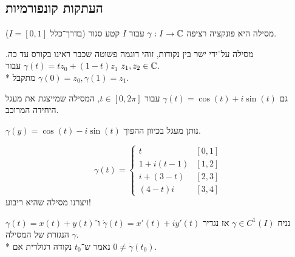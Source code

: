 \subsection{העתקות קונפורמיות}
\begin{definition}
	מסילה היא פונקציה רציפה $\gamma : I \to \mathbb{C}$ עבור $I$ קטע סגור (בדרך־כלל $I = [0, 1]$).
\end{definition}
\begin{example}
	מסילה על־ידי ישר בין נקודות, זוהי דוגמה פשוטה שכבר ראינו בקורס עד כה.
	$\gamma(t) = tz_0 + (1 - t)z_1$ עבור $z_1, z_2 \in \mathbb{C}$. \\*
	מתקבל $\gamma(0) = z_0, \gamma(1) = z_1$.
\end{example}
\begin{example}
	גם $\gamma(t) = \cos(t) + i \sin(t)$ עבור $t \in [0, 2\pi]$, המסילה שמייצגת את מעגל היחידה המרוכב.
\end{example}
\begin{example}
	$\gamma(y) = \cos(t) - i \sin(t)$ נותן מעגל בכיוון ההפוך.
\end{example}
\begin{example}
	\[
		\gamma(t) = \begin{cases}
			t & [0, 1] \\
			1 + i(t - 1) & [1, 2] \\
			i + (3 - t) & [2, 3] \\
			(4 - t)i & [3, 4]
		\end{cases}
	\]
	ויצרנו מסילה שהיא ריבוע!
\end{example}
נניח $\gamma \in C^1(I)$ אז נגדיר $\dot{\gamma}(t) = x'(t) + iy'(t)$ ו־$\gamma(t) = x(t) + y(t)$ הנגזרת של המסילה $\gamma$. \\*
נאמר ש־$t_0$ נקודה רגולרית אם $0 \ne \dot{\gamma}(t_0)$.

